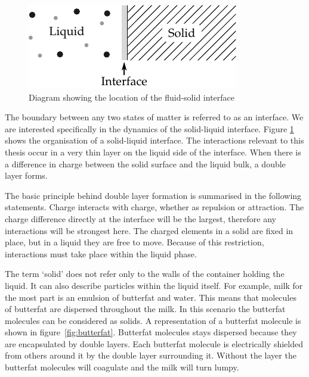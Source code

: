     \begin{figure}[h]
        \begin{center}
            \includegraphics{content/introduction/graphics/simpleLayerDiagram}
        \end{center}
        \caption{Diagram showing the location of the fluid-solid interface}
        \label{fig:interfaceDiagram}
    \end{figure}

    The boundary between any two states of matter is referred to as an interface.
    We are interested specifically in the dynamics of the solid-liquid interface.
    Figure \ref{fig:interfaceDiagram} shows the organisation of a solid-liquid interface.
    The interactions relevant to this thesis occur in a very thin layer on the liquid side of the interface.
    When there is a difference in charge between the solid surface and the liquid bulk, a double layer forms.

    The basic principle behind double layer formation is summarised in the following statements.
    Charge interacts with charge, whether as repulsion or attraction.
    The charge difference directly at the interface will be the largest, therefore any interactions will be strongest here.
    The charged elements in a solid are fixed in place, but in a liquid they are free to move.
    Because of this restriction, interactions must take place within the liquid phase.

    The term `solid' does not refer only to the walls of the container holding the liquid.
    It can also describe particles within the liquid itself.
    For example, milk for the most part is an emulsion of butterfat and water.
    This means that molecules of butterfat are dispersed throughout the milk.
    In this scenario the butterfat molecules can be considered as solids.
    A representation of a butterfat molecule is shown in figure~\ref{fig:butterfat}.
    Butterfat molecules stays dispersed because they are encapsulated by double layers.
    Each butterfat molecule is electrically shielded from others around it by the double layer surrounding it.
    Without the layer the butterfat molecules will coagulate and the milk will turn lumpy.

